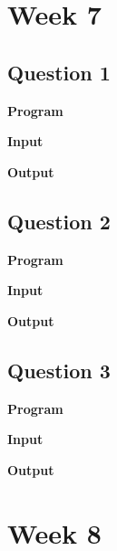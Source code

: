 \documentclass{article}
\begin{document}
% 

% 
% 
% 
\newpage
\section{Week 7}

\subsection{Question 1}

\newline

\noindent \textbf{\large{Program}}

\newpage
\noindent \textbf{\large{Input}}

\noindent \textbf{\large{Output}}


\newpage
\subsection{Question 2}

\newline

\noindent \textbf{\large{Program}}

\newpage
\noindent \textbf{\large{Input}}

\noindent \textbf{\large{Output}}


\newpage
\subsection{Question 3}

\newline

\noindent \textbf{\large{Program}}

\newpage
\noindent \textbf{\large{Input}}

\noindent \textbf{\large{Output}}

\newpage
\section{Week 8}
\end{document}
